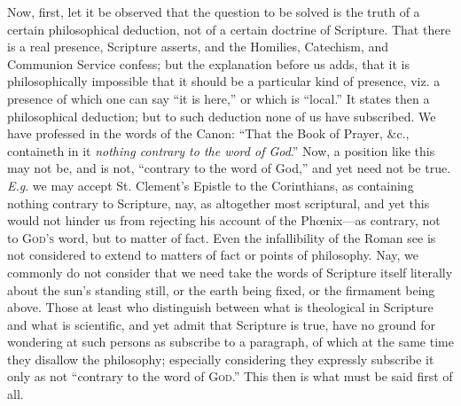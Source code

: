 Now, first, let it be observed that the question to be solved is
the truth of a certain philosophical deduction, not of a certain
doctrine of Scripture. That there is a real presence, Scripture
asserts, and the Homilies, Catechism, and Communion Service confess;
but the explanation before us adds, that it is philosophically
impossible that it should be a particular kind of presence, viz. a
presence of which one can say ``it is here,'' or which is
``local.'' It states then a philosophical deduction; but to
such deduction none of us have subscribed. We have professed in the
words of the Canon: ``That the Book of Prayer, \&c., containeth
in it \emph{nothing contrary to the word of God}.'' Now, a
position like this may not be, and is not, ``contrary to the word
of God,'' and yet need not be true. \emph{E.g}. we may accept St.
Clement's Epistle to the Corinthians, as containing nothing contrary
to Scripture, nay, as altogether most scriptural, and yet this would
not hinder us from rejecting his account of the Phœnix—as contrary,
not to G\textsc{od's} word, but to matter of fact.
Even the infallibility of the Roman see is not considered to extend to
matters of fact or points of philosophy. Nay, we commonly do not
consider that we need take the words of Scripture itself literally
about the sun's standing still, or the earth being fixed, or the
firmament being above. Those at least who distinguish between what is
theological in Scripture and what is scientific, and yet admit that
Scripture is true, have no ground for wondering at such persons as
subscribe to a paragraph, of which at the same time they disallow the
philosophy; especially considering they expressly subscribe it only as
not ``contrary to the word of G\textsc{od}.''
This then is what must be said first of all.

